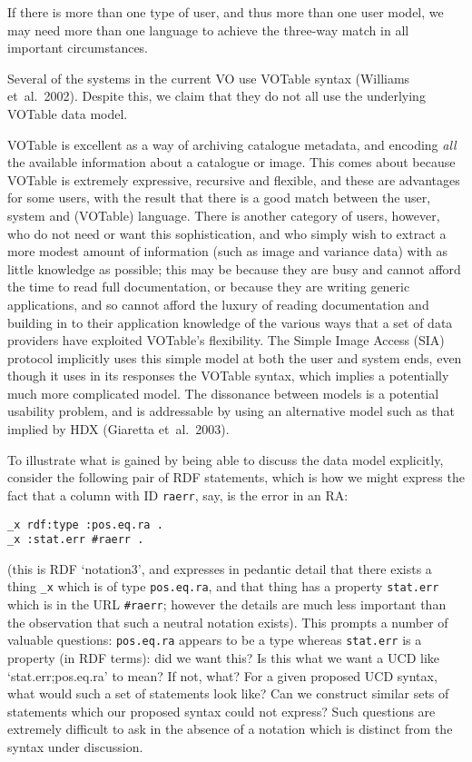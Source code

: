 \documentclass[11pt,twoside]{article}
\begin{document}
If there is more than one type of user, and thus more than one user
model, we may need more than one language to achieve the three-way
match in all important circumstances.

Several of the systems in the current VO use VOTable
syntax (Williams et~al.\ 2002).  Despite this, we claim that they do
not all use the underlying VOTable data model.

VOTable is excellent as a way of archiving catalogue metadata, and
encoding \emph{all} the available information about a catalogue or image.
This comes about because VOTable is extremely expressive, recursive and
flexible, and these are advantages for some users, with the result that
there is a good match between the user, system and (VOTable) language.
There is another category of users, however, who do not need or want this
sophistication, and who simply wish to extract a more modest amount of
information (such as image and variance data) with as little knowledge as
possible; this may be because they are busy and cannot afford the time to
read full documentation, or because they are writing generic applications,
and so cannot afford the luxury of reading documentation and building
in to their application knowledge of the various ways that a set of data
providers have exploited VOTable's flexibility.  The Simple Image Access
(SIA) protocol implicitly uses this simple model at both the user and
system ends, even though it uses in its responses the VOTable syntax,
which implies a potentially much more complicated model.  The
dissonance between models is a potential usability problem, and is
addressable by using an alternative model such as that implied by HDX
(Giaretta et~al.\ 2003).

To illustrate what is gained by being able to discuss the data model
explicitly, consider the following pair of RDF statements, which is
how we might express the fact that a column with ID \texttt{raerr},
say, is the error in an RA:
\begin{verbatim}
_x rdf:type :pos.eq.ra .
_x :stat.err #raerr .
\end{verbatim}
(this is RDF `notation3', and expresses in pedantic detail that there
exists a thing \texttt{\_x} which is of type \texttt{pos.eq.ra}, and that
thing has a property \texttt{stat.err} which is in the URL
\texttt{\#raerr}; however the details are much less important than the
observation that such a neutral notation exists).  This prompts a
number of valuable questions: \texttt{pos.eq.ra} appears to be a type
whereas \texttt{stat.err} is a property (in RDF terms): did we want
this?  Is this what we want a UCD like `stat.err;pos.eq.ra' to mean?
If not, what?  For a given proposed UCD syntax, what would such a set
of statements look like?  Can we construct similar sets of statements
which our proposed syntax could not express?  Such questions are
extremely difficult to ask in the absence of a notation which is
distinct from the syntax under discussion.
\end{document}
